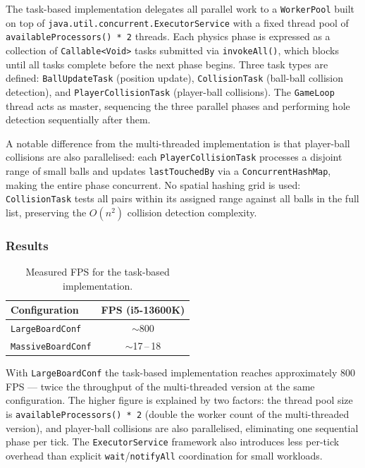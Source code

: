 \documentclass[12pt,a4paper]{article}
\begin{document}
The task-based implementation delegates all parallel work to a
\texttt{WorkerPool} built on top of \texttt{java.util.concurrent.ExecutorService}
with a fixed thread pool of \texttt{availableProcessors() * 2} threads.
Each physics phase is expressed as a collection of \texttt{Callable<Void>}
tasks submitted via \texttt{invokeAll()}, which blocks until all tasks
complete before the next phase begins. Three task types are defined:
\texttt{BallUpdateTask} (position update), \texttt{CollisionTask}
(ball-ball collision detection), and \texttt{PlayerCollisionTask}
(player-ball collisions). The \texttt{GameLoop} thread acts as master,
sequencing the three parallel phases and performing hole detection
sequentially after them.
 
A notable difference from the multi-threaded implementation is that
player-ball collisions are also parallelised: each \texttt{PlayerCollisionTask}
processes a disjoint range of small balls and updates \texttt{lastTouchedBy}
via a \texttt{ConcurrentHashMap}, making the entire phase concurrent.
No spatial hashing grid is used: \texttt{CollisionTask} tests all pairs
within its assigned range against all balls in the full list, preserving
the $O(n^2)$ collision detection complexity.
 
\subsubsection*{Results}
 
\begin{table}[H]
\centering
\begin{tabular}{lc}
\hline
\textbf{Configuration} & \textbf{FPS (i5-13600K)} \\
\hline
\texttt{LargeBoardConf}    & $\sim$800       \\
\texttt{MassiveBoardConf}  & $\sim$17\,--\,18 \\
\hline
\end{tabular}
\caption{Measured FPS for the task-based implementation.}
\label{tab:task-fps}
\end{table}
 
With \texttt{LargeBoardConf} the task-based implementation reaches
approximately 800\,FPS — twice the throughput of the multi-threaded
version at the same configuration. The higher figure is explained by
two factors: the thread pool size is \texttt{availableProcessors() * 2}
(double the worker count of the multi-threaded version), and player-ball
collisions are also parallelised, eliminating one sequential phase per
tick. The \texttt{ExecutorService} framework also introduces less
per-tick overhead than explicit \texttt{wait}/\texttt{notifyAll}
coordination for small workloads.
 
\end{document}
